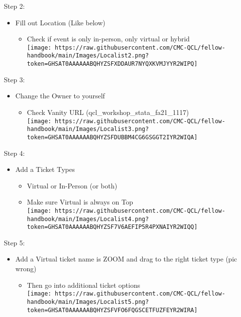 \documentclass[
]{book}
\providecommand{\tightlist}{%
  \setlength{\itemsep}{0pt}\setlength{\parskip}{0pt}}
\begin{document}
Step 2:

\begin{itemize}
\tightlist
\item
  Fill out Location (Like below)

  \begin{itemize}
  \tightlist
  \item
    Check if event is only in-person, only virtual or hybrid\\
    \texttt{[image: https://raw.githubusercontent.com/CMC-QCL/fellow-handbook/main/Images/Localist2.png?token=GHSAT0AAAAAABQHYZSFXDDAUR7NYQXKVMJYYR2WIPQ]}
  \end{itemize}
\end{itemize}

Step 3:

\begin{itemize}
\tightlist
\item
  Change the Owner to yourself

  \begin{itemize}
  \tightlist
  \item
    Check Vanity URL (qcl\_workshop\_stata\_fa21\_1117)\\
    \texttt{[image: https://raw.githubusercontent.com/CMC-QCL/fellow-handbook/main/Images/Localist3.png?token=GHSAT0AAAAAABQHYZSFDUBBM4CG6GSGGT2IYR2WIQA]}
  \end{itemize}
\end{itemize}

Step 4:

\begin{itemize}
\tightlist
\item
  Add a Ticket Types

  \begin{itemize}
  \tightlist
  \item
    Virtual or In-Person (or both)\\
  \item
    Make sure Virtual is always on Top\\
    \texttt{[image: https://raw.githubusercontent.com/CMC-QCL/fellow-handbook/main/Images/Localist4.png?token=GHSAT0AAAAAABQHYZSF7V6AEFIP5R4PXNAIYR2WIQQ]}
  \end{itemize}
\end{itemize}

Step 5:

\begin{itemize}
\tightlist
\item
  Add a Virtual ticket name is ZOOM and drag to the right ticket type (pic wrong)

  \begin{itemize}
  \tightlist
  \item
    Then go into additional ticket options\\
    \texttt{[image: https://raw.githubusercontent.com/CMC-QCL/fellow-handbook/main/Images/Localist5.png?token=GHSAT0AAAAAABQHYZSFVFO6FQGSCETFUZFEYR2WIRA]}
  \end{itemize}
\end{itemize}
\end{document}
